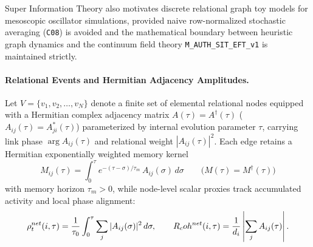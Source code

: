 Super Information Theory also motivates discrete relational graph toy models for mesoscopic oscillator simulations, provided naive row-normalized stochastic averaging (\texttt{C08}) is avoided and the mathematical boundary between heuristic graph dynamics and the continuum field theory \texttt{M\_AUTH\_SIT\_EFT\_v1} is maintained strictly.

\paragraph{Relational Events and Hermitian Adjacency Amplitudes.}
Let $V = \{v_1, v_2, \dots, v_N\}$ denote a finite set of elemental relational nodes equipped with a Hermitian complex adjacency matrix $A(\tau) = A^\dagger(\tau)$ ($A_{ij}(\tau) = A_{ji}^*(\tau)$) parameterized by internal evolution parameter $\tau$, carrying link phase $\arg A_{ij}(\tau)$ and relational weight $|A_{ij}(\tau)|^2$. Each edge retains a Hermitian exponentially weighted memory kernel
\begin{equation}
M_{ij}(\tau) = \int_0^\tau e^{-(\tau-\sigma)/\tau_m}\,A_{ij}(\sigma)\,d\sigma
\qquad \bigl(M(\tau) = M^\dagger(\tau)\bigr)
\end{equation}
with memory horizon $\tau_m > 0$, while node-level scalar proxies track accumulated activity and local phase alignment:
\begin{equation}
\rho_t^{net}(i,\tau) = \frac{1}{\tau_0}\int_0^\tau \sum_j |A_{ij}(\sigma)|^2\,d\sigma,
\qquad
R_coh^{net}(i,\tau) = \frac{1}{d_i}\left|\sum_j A_{ij}(\tau)\right|.
\end{equation}

